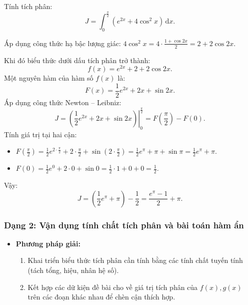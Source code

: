 \documentclass[12pt]{article}
\begin{document}
	\begin{vidu}
		Tính tích phân:
		\[
		J = \int_0^{\frac{\pi}{2}} (e^{2x} + 4\cos^2 x)\,\mathrm{d}x.
		\]
	\end{vidu}
	\begin{loigiai}
		Áp dụng công thức hạ bậc lượng giác: $4\cos^2 x = 4 \cdot \frac{1 + \cos 2x}{2} = 2 + 2\cos 2x$.
		
		Khi đó biểu thức dưới dấu tích phân trở thành:
		\[
		f(x) = e^{2x} + 2 + 2\cos 2x.
		\]
		Một nguyên hàm của hàm số $f(x)$ là:
		\[
		F(x) = \frac{1}{2} e^{2x} + 2x + \sin 2x.
		\]
		Áp dụng công thức Newton -- Leibniz:
		\[
		J = \left. \left( \frac{1}{2} e^{2x} + 2x + \sin 2x \right) \right|_0^{\frac{\pi}{2}} = F\left(\frac{\pi}{2}\right) - F(0).
		\]
		Tính giá trị tại hai cận:
		\begin{itemize}
			\item $F\left(\frac{\pi}{2}\right) = \frac{1}{2} e^{2 \cdot \frac{\pi}{2}} + 2 \cdot \frac{\pi}{2} + \sin\left(2 \cdot \frac{\pi}{2}\right) = \frac{1}{2} e^{\pi} + \pi + \sin \pi = \frac{1}{2} e^{\pi} + \pi$.
			\item $F(0) = \frac{1}{2} e^0 + 2 \cdot 0 + \sin 0 = \frac{1}{2} \cdot 1 + 0 + 0 = \frac{1}{2}$.
		\end{itemize}
		Vậy:
		\[
		J = \left( \frac{1}{2} e^{\pi} + \pi \right) - \frac{1}{2} = \frac{e^{\pi} - 1}{2} + \pi.
		\]
	\end{loigiai}
	
	\subsubsection{Dạng 2: Vận dụng tính chất tích phân và bài toán hàm ẩn}
	\begin{itemize}
		\item \textbf{Phương pháp giải:}
		\begin{enumerate}[label=Bước \arabic*:]
			\item Khai triển biểu thức tích phân cần tính bằng các tính chất tuyến tính (tách tổng, hiệu, nhân hệ số).
			\item Kết hợp các dữ kiện đề bài cho về giá trị tích phân của $f(x), g(x)$ trên các đoạn khác nhau để chèn cận thích hợp.
		\end{enumerate}
	\end{itemize}
	
\end{document}
